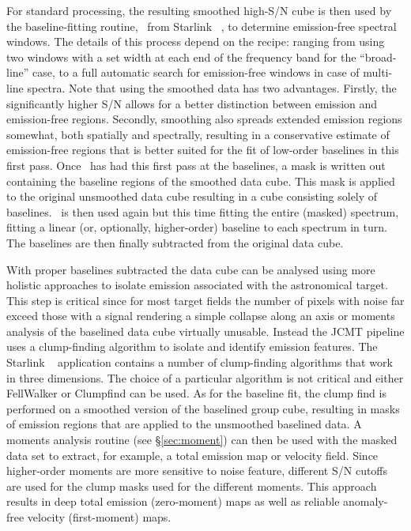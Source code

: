 \documentclass[final,authoryear,5p,times,twocolumn]{elsarticle}
\begin{document}
For standard processing, the resulting smoothed high-S/N cube
is then used by the baseline-fitting routine, \mfittrend\ from
Starlink \KAPPA\ \citep[][, see \S\ref{sec:mfittrend}]{SUN95,2008ASPC..394..650C},
to determine emission-free spectral windows.
The details of this process depend on the recipe: ranging from using two
windows with a set width at each end of the frequency band
for the ``broad-line'' case, to a full automatic search for emission-free
windows in case of multi-line spectra. Note that using the smoothed data has
two advantages. Firstly, the significantly higher S/N allows for a better
distinction between emission and emission-free regions. Secondly, smoothing
also spreads extended emission regions somewhat, both spatially and spectrally,
resulting in a conservative estimate of emission-free regions that is better suited for
the fit of low-order baselines in this first pass. Once \mfittrend\ has
had this first pass at the baselines, a mask is written out containing the
baseline regions of the smoothed data cube. This mask is applied to the original
unsmoothed data cube resulting in a cube consisting solely of
baselines. \mfittrend\ is then used again but this time fitting
the entire (masked) spectrum, fitting a linear (or, optionally, higher-order) baseline
to each spectrum in turn. The baselines are then finally subtracted from the
original data cube.

With proper baselines subtracted the data cube can be analysed using more
holistic approaches to isolate emission associated with the astronomical
target. This step is critical since for most target fields the number of pixels with
noise far exceed those with a signal rendering a simple collapse along an axis
or moments analysis of the baselined data cube virtually unusable. Instead
the JCMT pipeline uses a clump-finding algorithm to isolate and identify
emission features.
The Starlink \cupid\ \citep[][]{2007ASPC..376..425B} application contains
a number of clump-finding algorithms that work in three dimensions.
The choice of a particular algorithm is not critical and either FellWalker \citep{2015FW} or
Clumpfind \citep[][]{1994ApJ...428..693W} can be used.
As for the baseline fit, the clump find is performed on a smoothed version
of the baselined group cube, resulting in masks of emission regions that
are applied to the unsmoothed baselined data. A moments analysis routine
(see \mbox{\S \ref{sec:moment}}) can then be used with the masked data set to
extract, for example, a total emission map or velocity field. Since higher-order moments are
more sensitive to noise feature, different S/N cutoffs are used for the
clump masks used for the different moments. This approach results in deep
total emission (zero-moment) maps as well as reliable anomaly-free
velocity (first-moment) maps.
\end{document}
